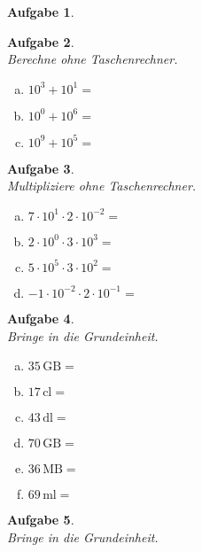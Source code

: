 \documentclass[12pt,fleqn]{article}
\theoremstyle{aufg}
\newtheorem{aufgabe}{Aufgabe}
\theoremstyle{bsp}
\begin{document}
\begin{flushleft}
\begin{aufgabe}
\begin{multicols}{3}
\end{multicols} 
\end{aufgabe} 
\begin{aufgabe} ~ \\ 
Berechne ohne Taschenrechner. \\ 
\begin{multicols}{3} 
\begin{enumerate}[a)] 
\item 
$10^{3}+10^{1}=$
\item 
$10^{0}+10^{6}=$
\item 
$10^{9}+10^{5}=$
\end{enumerate} 
\end{multicols} 
\end{aufgabe} 
\begin{aufgabe} ~ \\ 
Multipliziere ohne Taschenrechner. \\ 
\begin{multicols}{2} 
\begin{enumerate}[a)] 
\item 
$7\cdot10^{1}\cdot2\cdot10^{-2}=$
\item 
$2\cdot10^{0}\cdot3\cdot10^{3}=$
\item 
$5\cdot10^{5}\cdot3\cdot10^{2}=$
\item 
$-1\cdot10^{-2}\cdot2\cdot10^{-1}=$
\end{enumerate} 
\end{multicols} 
\end{aufgabe} 
\begin{aufgabe} ~ \\ 
Bringe in die Grundeinheit. \\ 
\begin{multicols}{3} 
\begin{enumerate}[a)] 
\item 
$35\,\mathrm{GB}=$
\item 
$17\,\mathrm{cl}=$
\item 
$43\,\mathrm{dl}=$
\item 
$70\,\mathrm{GB}=$
\item 
$36\,\mathrm{MB}=$
\item 
$69\,\mathrm{ml}=$
\end{enumerate} 
\end{multicols} 
\end{aufgabe} 
\begin{aufgabe} ~ \\ 
Bringe in die Grundeinheit. \\ 

\end{aufgabe}
\end{flushleft}
\end{document}
